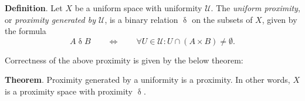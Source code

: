 \documentclass[12pt]{article}
\begin{document}
{\bf Definition}. Let $X$ be a uniform space with uniformity $\mathcal{U}$.  The \emph{uniform proximity}, or \emph{proximity generated by $\mathcal{U}$}, is a binary relation $\mathrel{\delta}$ on the subsets of $X$, given by the formula
$$A\mathrel{\delta}B \qquad \iff \qquad \forall U\in\mathcal{U}:U\cap(A\times B)\neq\emptyset.$$

Correctness of the above proximity is given by the below theorem:

{\bf Theorem}. Proximity generated by a uniformity is a proximity.  In other words, $X$ is a proximity space with proximity $\mathrel{\delta}$.
\end{document}
